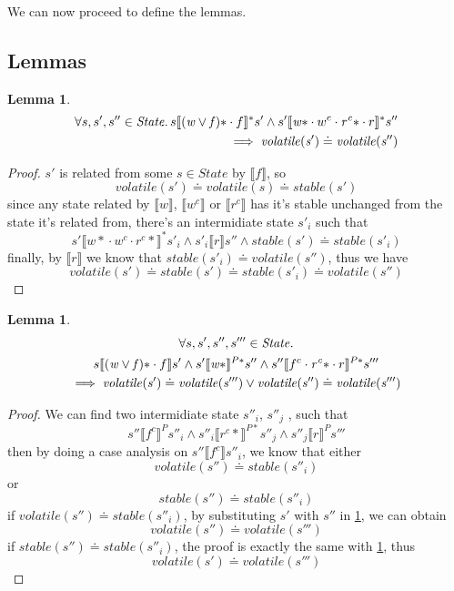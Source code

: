\documentclass[a4paper,11pt]{article}
\newtheorem{lemma}[theorem]{Lemma}
\theoremstyle{definition}
\begin{document}
We can now proceed to define the lemmas.

\subsection{Lemmas}

\begin{lemma}\label{lemma-2-1}
\begin{align*}
	\forall s, s', s'' \in \mathit{State} \ldotp s \llbracket \mathit{(w \lor f)\ast} \cdot f \rrbracket^* s' \land s' \llbracket \mathit{w\ast} \cdot w^c \cdot \mathit{r^c\ast} \cdot r \rrbracket^* s'' \\
	  \implies \mathit{volatile(s')} \doteq \mathit{volatile(s'')}
\end{align*}
\end{lemma}
\begin{proof}
	$s'$ is related from some $s \in \mathit{State}$ by $\llbracket f \rrbracket$, so
		$$\mathit{volatile(s')} \doteq \mathit{volatile(s)} \doteq \mathit{stable(s')}$$
	since any state related by $\llbracket w \rrbracket$, $\llbracket w^c \rrbracket$ or $\llbracket r^c \rrbracket$ has it's stable unchanged from the state it's related from, there's an intermidiate state $s'_i$ such that
		$$s' \llbracket {w*} \cdot w^c \cdot {r^c *} \rrbracket^* s'_i \land s'_i \llbracket r \rrbracket s'' \land stable(s') \doteq stable(s'_i)$$
	finally, by $\llbracket r \rrbracket$ we know that $\mathit{stable(s'_i) \doteq volatile(s'')}$, thus we have
		$$\mathit{volatile(s') \doteq stable(s') \doteq stable(s'_i) \doteq volatile(s'')}$$
\end{proof}

\begin{lemma}\label{lemma-2-2}
\begin{multline*}
      \forall s, s', s'', s''' \in \mathit{State} \ldotp \\
      s \llbracket \mathit{(w \lor f)\ast} \cdot f \rrbracket s' \land
	  s' \llbracket \mathit{w\ast} \rrbracket^{P*} s'' \land
	  s'' \llbracket f^c \cdot \mathit{r^c\ast} \cdot r \rrbracket^{P*} s'''\\ \implies \mathit{volatile(s')} \doteq \mathit{volatile(s''')} \lor \mathit{volatile(s'')} \doteq \mathit{volatile(s''')}
\end{multline*}
\end{lemma}
\begin{proof}
	We can find two intermidiate state $s''_i$, $s''_j$ , such that $$s'' \llbracket f^c \rrbracket^P s''_i \land s''_i \llbracket r^c* \rrbracket^{P*} s''_j \land s''_j \llbracket r \rrbracket^P s'''$$
	then by doing a case analysis on $s'' \llbracket f^c \rrbracket s''_i$, we know that either $$\mathit{volatile(s'') \doteq stable(s''_i)}$$ or $$\mathit{stable(s'') \doteq stable(s''_i)}$$
	if $\mathit{volatile(s'') \doteq stable(s''_i)}$, by substituting $s'$ with $s''$ in
	\cref{lemma-2-1}, we can obtain $$\mathit{volatile(s'') \doteq volatile(s''')}$$
	if $\mathit{stable(s'') \doteq stable(s''_i)}$, the proof is exactly the same with \cref{lemma-2-1}, thus $$\mathit{volatile(s') \doteq volatile(s''')}$$
\end{proof}
\end{document}
